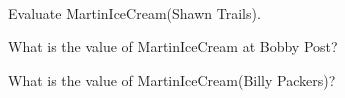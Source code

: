 \documentclass{ximera}
\begin{document}
\quad \\




\begin{question}
Evaluate MartinIceCream(Shawn Trails).
\begin{multipleChoice}
\end{multipleChoice}
\end{question}



\begin{question}
What is the value of MartinIceCream at Bobby Post?
\begin{multipleChoice}
\end{multipleChoice}
\end{question}




\begin{question}
What is the value of MartinIceCream(Billy Packers)?
\begin{multipleChoice}
\end{multipleChoice}
\end{question}
\end{document}
